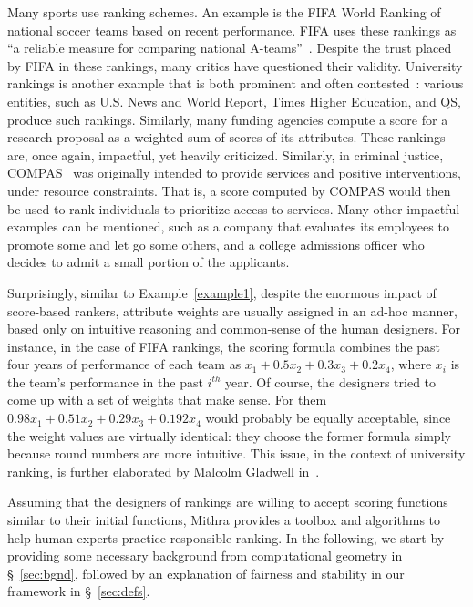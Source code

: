 Many sports use ranking schemes. An example is the FIFA World Ranking of national soccer teams based on  recent performance.
FIFA uses these rankings as ``a reliable measure for comparing national A-teams''~\cite{fifa}. 
Despite the trust placed by FIFA in these rankings, many critics have questioned their validity.
University rankings is another example that is both prominent and often contested~\cite{Gladwell11Order}: various entities, such as U.S. News and World Report, Times Higher Education, and QS, produce such rankings.  Similarly, many funding agencies compute a score for a research proposal as a weighted sum of scores of its attributes. These rankings are, once again, impactful, yet heavily criticized.
Similarly, in criminal justice, COMPAS~\cite{propublica} was originally intended to provide services and positive interventions, under resource constraints.  That is, a score computed by COMPAS would then be used to rank individuals to prioritize access to services.
Many other impactful examples can be mentioned, such as a company that evaluates its employees to promote some and let go some others, and a college admissions officer who decides to admit a small portion of the applicants.

Surprisingly, similar to Example~\ref{example1}, despite the enormous impact of score-based rankers, attribute weights are usually assigned in an ad-hoc manner, based only on intuitive reasoning and common-sense of the human designers.
For instance, in the case of FIFA rankings, the scoring formula combines  the past four years  of performance of each team as $x_1+0.5x_2+0.3x_3+0.2x_4$, where $x_i$ is the team's performance in the past $i^{th}$ year. Of course, the designers tried to come up with a set of weights that make sense. For them $0.98x_1+0.51x_2+0.29x_3+0.192x_4$ would probably be equally acceptable, since the weight values are virtually identical: they choose the former formula simply because round numbers are more intuitive.
This issue, in the context of university ranking, is further elaborated by Malcolm Gladwell in~\cite{Gladwell11Order}.

Assuming that the designers of rankings are willing to accept scoring functions similar to their initial functions, Mithra provides a toolbox and algorithms to help human experts practice responsible ranking. In the following, we start by providing some necessary background from computational geometry in \S~\ref{sec:bgnd}, followed by an explanation of fairness and stability in our framework in \S~\ref{sec:defs}.

